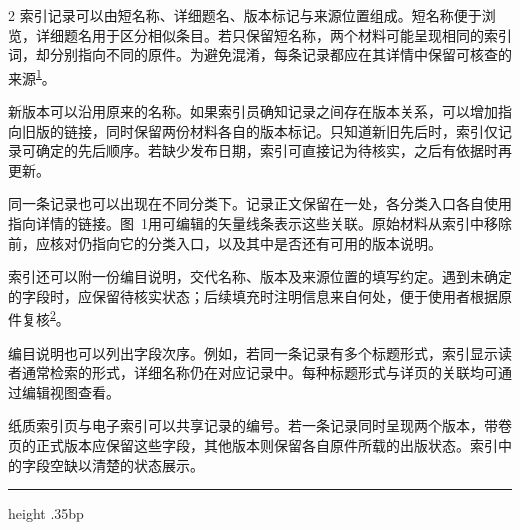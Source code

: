 \documentclass[UTF8,fontset=none,scheme=plain]{ctexart}
\newcommand{\LetterCite}[1]{\textsuperscript{\hyperlink{ref:#1}{#1}}}
\begin{document}
\begin{multicols}{2}
\noindent 索引记录可以由短名称、详细题名、版本标记与来源位置组成。短名称便于浏览，详细题名用于区分相似条目。若只保留短名称，两个材料可能呈现相同的索引词，却分别指向不同的原件。为避免混淆，每条记录都应在其详情中保留可核查的来源\LetterCite{1}。

新版本可以沿用原来的名称。如果索引员确知记录之间存在版本关系，可以增加指向旧版的链接，同时保留两份材料各自的版本标记。只知道新旧先后时，索引仅记录可确定的先后顺序。若缺少发布日期，索引可直接记为待核实，之后有依据时再更新。

同一条记录也可以出现在不同分类下。记录正文保留在一处，各分类入口各自使用指向详情的链接。图~1用可编辑的矢量线条表示这些关联。原始材料从索引中移除前，应核对仍指向它的分类入口，以及其中是否还有可用的版本说明。

索引还可以附一份编目说明，交代名称、版本及来源位置的填写约定。遇到未确定的字段时，应保留待核实状态；后续填充时注明信息来自何处，便于使用者根据原件复核\LetterCite{2}。

编目说明也可以列出字段次序。例如，若同一条记录有多个标题形式，索引显示读者通常检索的形式，详细名称仍在对应记录中。每种标题形式与详页的关联均可通过编辑视图查看。

纸质索引页与电子索引可以共享记录的编号。若一条记录同时呈现两个版本，带卷页的正式版本应保留这些字段，其他版本则保留各自原件所载的出版状态。索引中的字段空缺以清楚的状态展示。
\end{multicols}
\vfill\hrule height .35bp\vspace{6bp}
\end{document}

